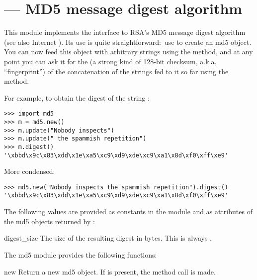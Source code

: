 \section{ ---
         MD5 message digest algorithm}



This module implements the interface to RSA's MD5 message digest
algorithm (see also Internet ).  Its use is quite
straightforward:\ use  to create an md5 object.
You can now feed this object with arbitrary strings using the
 method, and at any point you can ask it for the
 (a strong kind of 128-bit checksum,
a.k.a. ``fingerprint'') of the concatenation of the strings fed to it
so far using the  method.

For example, to obtain the digest of the string :

\begin{verbatim}
>>> import md5
>>> m = md5.new()
>>> m.update("Nobody inspects")
>>> m.update(" the spammish repetition")
>>> m.digest()
'\xbbd\x9c\x83\xdd\x1e\xa5\xc9\xd9\xde\xc9\xa1\x8d\xf0\xff\xe9'
\end{verbatim}

More condensed:

\begin{verbatim}
>>> md5.new("Nobody inspects the spammish repetition").digest()
'\xbbd\x9c\x83\xdd\x1e\xa5\xc9\xd9\xde\xc9\xa1\x8d\xf0\xff\xe9'
\end{verbatim}

The following values are provided as constants in the module and as
attributes of the md5 objects returned by :

\begin{datadesc}{digest_size}
  The size of the resulting digest in bytes.  This is always
  .
\end{datadesc}

The md5 module provides the following functions:

\begin{funcdesc}{new}{}
Return a new md5 object.  If  is present, the method call
 is made.
\end{funcdesc}

